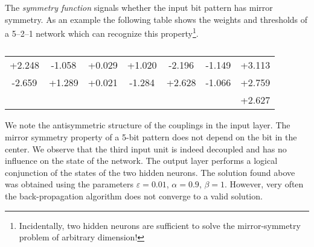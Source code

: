 The \emph{symmetry function} signals whether the input bit pattern has mirror symmetry. As an example the following table shows the weights and thresholds of a 5--2--1 network which can recognize this property\footnote{Incidentally, two hidden neurons are sufficient to solve the mirror-symmetry problem of arbitrary dimension!}.
\begin{table}[h!t]
\centering
{}
\renewcommand{\arraystretch}{1.25}
\begin{tabular}{CCCCC|C|C}
\hline
+2.248 & -1.058 & +0.029 & +1.020 & -2.196 & -1.149 & +3.113 \\
-2.659 & +1.289 & +0.021 & -1.284 & +2.628 & -1.066 & +2.759 \\
\hline
{} & +2.627 \\
\end{tabular}
\caption{}\label{PERBOOL:tab3}
\end{table}

We note the antisymmetric structure of the couplings in the input layer. The mirror symmetry property of a 5-bit pattern does not depend on the bit in the center. We observe that the third input unit is indeed decoupled and has no influence on the state of the network. The output layer performs a logical conjunction of the states of the two hidden neurons. The solution found above was obtained using the parameters $\varepsilon=0.01$, $\alpha=0.9$, $\beta=1$. However, very often the back-propagation algorithm does not converge to a valid solution.
